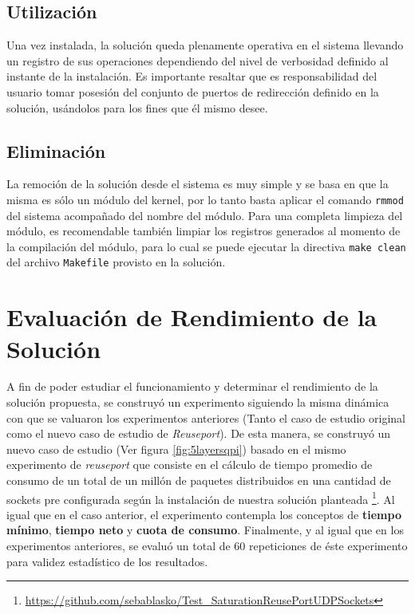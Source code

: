 \subsection{Utilización}
Una vez instalada, la solución queda plenamente operativa en el sistema llevando un registro de sus operaciones dependiendo del nivel de verbosidad definido al instante de la instalación. Es importante resaltar que es responsabilidad del usuario tomar posesión del conjunto de puertos de redirección definido en la solución, usándolos para los fines que él mismo desee.

\subsection{Eliminación}
La remoción de la solución desde el sistema es muy simple y se basa en que la misma es sólo un módulo del kernel, por lo tanto basta aplicar el comando \verb=rmmod= del sistema acompañado del nombre del módulo. Para una completa limpieza del módulo, es recomendable también limpiar los registros generados al momento de la compilación del módulo, para lo cual se puede ejecutar la directiva \verb=make clean= del archivo \verb=Makefile= provisto en la solución.

\section{Evaluación de Rendimiento de la Solución}

A fin de poder estudiar el funcionamiento y determinar el rendimiento de la solución propuesta, se construyó un experimento siguiendo la misma dinámica con que se valuaron los experimentos anteriores (Tanto el caso de estudio original como el nuevo caso de estudio de \emph{Reuseport}). De esta manera, se construyó un nuevo caso de estudio (Ver figura \ref{fig:5layersqpi}) basado en el mismo experimento de \emph{reuseport} que consiste en el cálculo de tiempo promedio de consumo de un total de un millón de paquetes distribuidos en una cantidad de sockets pre configurada según la instalación de nuestra solución planteada \footnote{\url{ https://github.com/sebablasko/Test_SaturationReusePortUDPSockets}}. Al igual que en el caso anterior, el experimento contempla los conceptos de \textbf{tiempo mínimo}, \textbf{tiempo neto} y \textbf{cuota de consumo}. Finalmente, y al igual que en los experimentos anteriores, se evaluó un total de 60 repeticiones de éste experimento para validez estadístico de los resultados.

